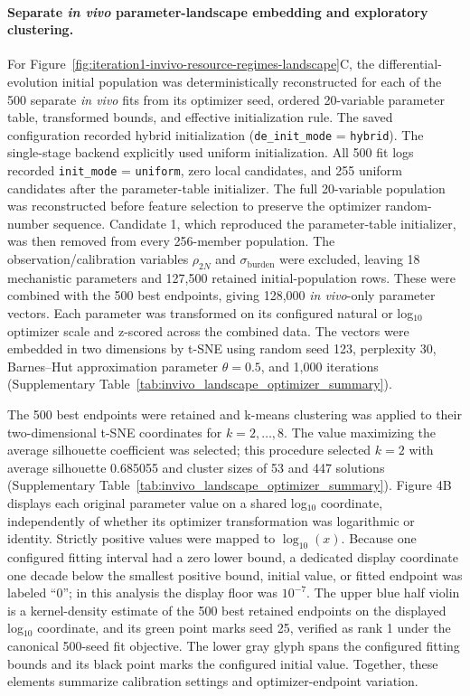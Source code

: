 \documentclass[11pt]{article}
\begin{document}
\paragraph{Separate \textit{in vivo} parameter-landscape embedding and exploratory clustering.}
For Figure~\ref{fig:iteration1-invivo-resource-regimes-landscape}C, the differential-evolution initial population was deterministically reconstructed for each of the 500 separate \textit{in vivo} fits from its optimizer seed, ordered 20-variable parameter table, transformed bounds, and effective initialization rule. The saved configuration recorded hybrid initialization (\texttt{de\_init\_mode} = \texttt{hybrid}). The single-stage backend explicitly used uniform initialization. All 500 fit logs recorded \texttt{init\_mode} = \texttt{uniform}, zero local candidates, and 255 uniform candidates after the parameter-table initializer. The full 20-variable population was reconstructed before feature selection to preserve the optimizer random-number sequence. Candidate 1, which reproduced the parameter-table initializer, was then removed from every 256-member population. The observation/calibration variables \(\rho_{2N}\) and \(\sigma_{\mathrm{burden}}\) were excluded, leaving 18 mechanistic parameters and 127,500 retained initial-population rows. These were combined with the 500 best endpoints, giving 128,000 \textit{in vivo}-only parameter vectors. Each parameter was transformed on its configured natural or log$_{10}$ optimizer scale and z-scored across the combined data. The vectors were embedded in two dimensions by t-SNE using random seed 123, perplexity 30, Barnes--Hut approximation parameter \(\theta=0.5\), and 1,000 iterations (Supplementary Table~\ref{tab:invivo_landscape_optimizer_summary}).

The 500 best endpoints were retained and k-means clustering was applied to their two-dimensional t-SNE coordinates for \(k=2,\ldots,8\). The value maximizing the average silhouette coefficient was selected; this procedure selected \(k=2\) with average silhouette 0.685055 and cluster sizes of 53 and 447 solutions (Supplementary Table~\ref{tab:invivo_landscape_optimizer_summary}). Figure 4B displays each original parameter value on a shared log$_{10}$ coordinate, independently of whether its optimizer transformation was logarithmic or identity. Strictly positive values were mapped to $\log_{10}(x)$. Because one configured fitting interval had a zero lower bound, a dedicated display coordinate one decade below the smallest positive bound, initial value, or fitted endpoint was labeled ``0''; in this analysis the display floor was $10^{-7}$. The upper blue half violin is a kernel-density estimate of the 500 best retained endpoints on the displayed log$_{10}$ coordinate, and its green point marks seed 25, verified as rank 1 under the canonical 500-seed fit objective. The lower gray glyph spans the configured fitting bounds and its black point marks the configured initial value. Together, these elements summarize calibration settings and optimizer-endpoint variation.
\end{document}
